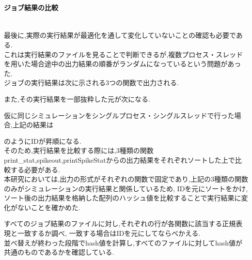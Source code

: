 \paragraph{ジョブ結果の比較}~\\
最後に,実際の実行結果が最適化を通して変化していないことの確認も必要である.\\
これは実行結果のファイルを見ることで判断できるが,複数プロセス・スレッドを用いた場合途中の出力結果の順番がランダムになっているという問題があった.\\
ジョブの実行結果は次に示される3つの関数で出力される.\\
{\footnotesize

}
また,その実行結果を一部抜粋した元が次になる.\\
{\footnotesize

}
仮に同じシミュレーションをシングルプロセス・シングルスレッドで行った場合,上記の結果は
{\footnotesize

}
のようにIDが昇順になる.\\
そのため,実行結果を比較する際には,3種類の関数print\_stat,spikeout,printSpikeStatからの出力結果をそれぞれソートした上で比較する必要がある.\\
本研究においては,出力の形式がそれぞれの関数で固定であり,上記の3種類の関数のみがシミュレーションの実行結果と関係しているため,
IDを元にソートをかけ,ソート後の出力結果を格納した配列のハッシュ値を比較することで実行結果に変化がないことを確かめた.\\
{\footnotesize

}
すべてのジョブ結果のファイルに対し,それぞれの行が各関数に該当する正規表現と一致するか調べ,
一致する場合はIDを元にしてならべかえる.\\
並べ替えが終わった段階でhash値を計算し,すべてのファイルに対してhash値が共通のものであるかを確認している.\\



